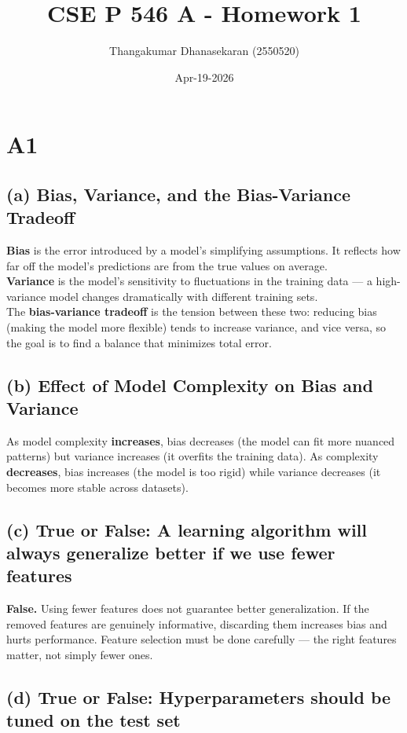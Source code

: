 \documentclass{article}
\title{CSE P 546 A - Homework 1}
\author{Thangakumar Dhanasekaran (2550520)}
\date{Apr-19-2026}
\begin{document}
\maketitle

\section*{A1}

\subsection*{(a) Bias, Variance, and the Bias-Variance Tradeoff}

\textbf{Bias} is the error introduced by a model's simplifying assumptions. It reflects how far off the model's predictions are from the true values on average.\\ \textbf{Variance} is the model's sensitivity to fluctuations in the training data --- a high-variance model changes dramatically with different training sets.\\ The \textbf{bias-variance tradeoff} is the tension between these two: reducing bias (making the model more flexible) tends to increase variance, and vice versa, so the goal is to find a balance that minimizes total error.

\subsection*{(b) Effect of Model Complexity on Bias and Variance}

As model complexity \textbf{increases}, bias decreases (the model can fit more nuanced patterns) but variance increases (it overfits the training data). As complexity \textbf{decreases}, bias increases (the model is too rigid) while variance decreases (it becomes more stable across datasets).

\subsection*{(c) True or False: A learning algorithm will always generalize better if we use fewer features}

\textbf{False.} Using fewer features does not guarantee better generalization. If the removed features are genuinely informative, discarding them increases bias and hurts performance. Feature selection must be done carefully --- the right features matter, not simply fewer ones.

\subsection*{(d) True or False: Hyperparameters should be tuned on the test set}
\end{document}
